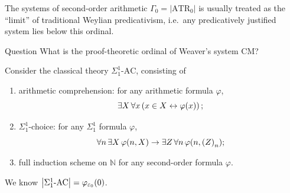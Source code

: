 \documentclass{beamer}
\begin{document}
\begin{frame}{The systems of second-order arithmetic}
  $\Gamma_0 = \left|\mathrm{ATR}_0\right|$ is usually treated as the ``limit'' of traditional Weylian predicativism, i.e.\ any predicatively justified system lies below this ordinal.

  \begin{block}{Question}
    What is the proof-theoretic ordinal of Weaver's system $\mathrm{CM}$?
  \end{block}

  \pause

  \vspace{0.6em}

  Consider the classical theory $\Sigma^1_1\text{-}\mathrm{AC}$, consisting of
  \begin{enumerate}
    \item arithmetic comprehension: for any arithmetic formula $\varphi$,
          \[\exists X \, \forall x \left(x \in X \leftrightarrow \varphi\mleft(x\mright)\right);\]
    \item $\Sigma^1_1$-choice: for any $\Sigma^1_1$ formula $\varphi$,
          \[\forall n \, \exists X \, \varphi\mleft(n, X\mright) \rightarrow \exists Z \, \forall n \, \varphi\mleft(n, \left(Z\right)_n\mright);\]
    \item full induction scheme on $\mathbb{N}$ for any second-order formula $\varphi$.
  \end{enumerate}

  We know $\left|\Sigma^1_1\text{-}\mathrm{AC}\right| = \varphi_{\varepsilon_0}\mleft(0\mright)$. \cite{friedman67-thesis}
\end{frame}
\end{document}
